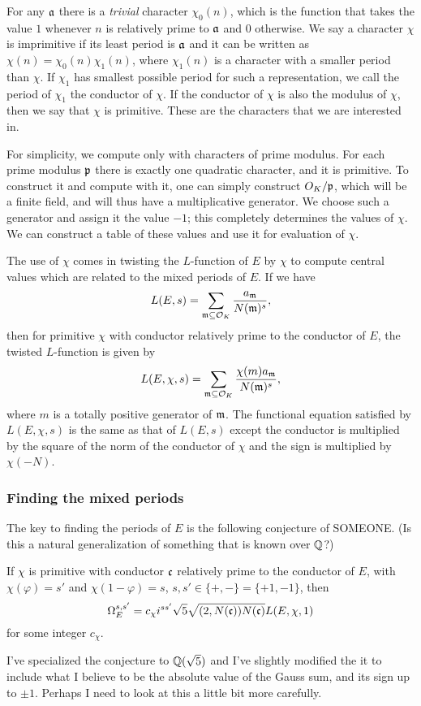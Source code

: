 For any $\mathfrak{a}$ there is a \emph{trivial} character $\chi_0(n)$, which is the function that takes the value $1$
whenever $n$ is relatively prime to $\mathfrak{a}$ and $0$ otherwise. We say a character $\chi$ is imprimitive if its
least period is $\mathfrak{a}$ and it can be written as $\chi(n) = \chi_0(n)\chi_1(n)$, where $\chi_1(n)$ is a character
with a smaller period than $\chi$. If $\chi_1$ has smallest possible period for
such a representation, we call the period of $\chi_1$ the conductor of $\chi$. If the conductor of $\chi$ is
also the modulus of $\chi$, then we say that $\chi$ is primitive. These are the characters that we are
interested in.

For simplicity, we compute only with characters of prime modulus. For each prime modulus $\mathfrak{p}$ there is
exactly one quadratic character, and it is primitive. To construct it and compute with it, one can simply
construct $O_K/\mathfrak{p}$, which will be a finite field, and will thus have a multiplicative generator. We choose
such a generator and assign it the value $-1$; this completely determines the values of $\chi$. We can
construct a table of these values and use it for evaluation of $\chi$.

The use of $\chi$ comes in twisting the $L$-function of $E$ by $\chi$ to compute central values
which are related to the mixed periods of $E$. If we have
\[
    L(E, s) = \sum_{\mathfrak{m} \subseteq \mathcal{O}_K} \frac{a_{\mathfrak{m}}}{N(\mathfrak{m})^s},
\]
then for primitive $\chi$ with conductor relatively prime to the conductor of $E$, the twisted $L$-function
is given by
\[
    L(E, \chi, s) = \sum_{\mathfrak{m} \subseteq \mathcal{O}_K} \frac{\chi(m) a_{\mathfrak{m}}}{N(\mathfrak{m})^s},
\]
where $m$ is a totally positive generator of $\mathfrak{m}$. The functional equation satisfied by $L(E, \chi, s)$ is
the same as that of $L(E, s)$ except the conductor is multiplied by the square of the norm of the conductor
of $\chi$ and the sign is multiplied by $\chi(-N)$.

\subsubsection{Finding the mixed periods}
The key to finding the periods of $E$ is the following conjecture of SOMEONE. (Is this a natural generalization
of something that is known over $\mathbb{Q}$?)
\begin{conjecture} If $\chi$ is primitive with conductor $\mathfrak{c}$ relatively prime to the conductor of $E$,
with $\chi(\varphi) = s'$ and $\chi(1 - \varphi) = s$, $s, s' \in \{+, -\} = \{+1, -1\}$, then
\[
    \Omega^{s,s'}_E = c_\chi i^{ss'} \sqrt{5} \sqrt{(2, N(\mathfrak{c}))N(\mathfrak{c})} L(E, \chi, 1)
\]
for some integer $c_\chi$.
\end{conjecture}
\begin{remark}
I've specialized the conjecture to $\mathbb{Q}(\sqrt 5)$ and I've slightly modified the it to include what I believe to be
the absolute value of the Gauss sum, and its sign up to $\pm 1$. Perhaps I need to look at this a little bit more
carefully.
\end{remark}


